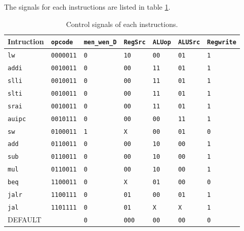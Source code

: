 \documentclass[12pt]{article}
\begin{document}
The signals for each instructions are listed in table \ref{tab:control}.

\begin{table}[h]
\centering
\begin{tabular}{@{}lllllll@{}}
\toprule
Intruction     & \texttt{opcode}           & \texttt{men\_wen\_D}  & \texttt{RegSrc}       & \texttt{ALUop}       & \texttt{ALUSrc}      & \texttt{Regwrite}   \\ \midrule
\texttt{lw}    & \texttt{0000011} & \texttt{0} & \texttt{10} & \texttt{00} & \texttt{01} & \texttt{1} \\
\texttt{addi}  & \texttt{0010011} & \texttt{0} & \texttt{00}   & \texttt{11} & \texttt{01} & \texttt{1} \\
\texttt{slli}  & \texttt{0010011} & \texttt{0} & \texttt{00}   & \texttt{11} & \texttt{01} & \texttt{1} \\
\texttt{slti}  & \texttt{0010011} & \texttt{0} & \texttt{00}   & \texttt{11} & \texttt{01} & \texttt{1} \\
\texttt{srai}  & \texttt{0010011} & \texttt{0} & \texttt{00}   & \texttt{11} & \texttt{01} & \texttt{1} \\
\texttt{auipc} & \texttt{0010111} & \texttt{0} & \texttt{00} & \texttt{00} & \texttt{11} & \texttt{1} \\
\texttt{sw}    & \texttt{0100011} & \texttt{1} & \texttt{X}   & \texttt{00} & \texttt{01} & \texttt{0} \\
\texttt{add}   & \texttt{0110011} & \texttt{0} & \texttt{00}   & \texttt{10} & \texttt{00} & \texttt{1} \\
\texttt{sub}   & \texttt{0110011} & \texttt{0} & \texttt{00}   & \texttt{10} & \texttt{00} & \texttt{1} \\
\texttt{mul}   & \texttt{0110011} & \texttt{0} & \texttt{00}   & \texttt{10} & \texttt{00} & \texttt{1} \\
\texttt{beq}   & \texttt{1100011} & \texttt{0} & \texttt{X}   & \texttt{01} & \texttt{00} & \texttt{0} \\
\texttt{jalr}  & \texttt{1100111} & \texttt{0} & \texttt{01}   & \texttt{00} & \texttt{01} & \texttt{1} \\
\texttt{jal}   & \texttt{1101111} & \texttt{0} & \texttt{01}   & \texttt{X}  & \texttt{X}  & \texttt{1} \\
DEFAULT        &                  & \texttt{0} & \texttt{000} & \texttt{00} & \texttt{00} & \texttt{0} \\ \bottomrule
\end{tabular}
\caption{Control signals of each instructions.}
\label{tab:control}
\end{table} 
\end{document}

